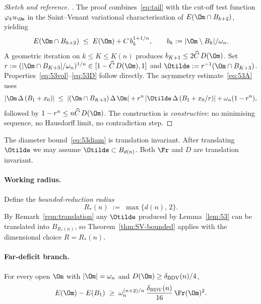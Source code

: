 \begin{proof}[Sketch and reference]
\cite[Lemma~5.3]{BDV}. The proof combines~\eqref{eq:tail} with the
cut-off test function $\varphi_k u_\Om$ in the Saint--Venant
variational characterisation of $E(\Om\cap B_{k+2})$, yielding
\cite[(5.11)]{BDV}
\[
E(\Om\cap B_{k+2}) \;\le\; E(\Om) + C\,b_k^{1+1/n},
\qquad b_k := |\Om\setminus B_k|/\omega_n.
\]
A geometric iteration on $k\le K\le K(n)$ produces $b_{K+1}\le
2\widehat C\,D(\Om)$. Set $r:=(|\Om\cap B_{K+3}|/\omega_n)^{1/n}\in
[1-\widehat C\,D(\Om),1]$ and $\Otilde:=r^{-1}(\Om\cap B_{K+3})$.
Properties~\eqref{eq:53vol}--\eqref{eq:53D} follow directly. The
asymmetry estimate~\eqref{eq:53A} uses
\[
|\Om\,\Delta\,(B_1+x_0)|
\;\le\;
|(\Om\cap B_{K+3})\,\Delta\,\Om|
+ r^n\,|\Otilde\,\Delta\,(B_1+x_0/r)|
+ \omega_n(1-r^n),
\]
followed by $1-r^n\le n\widehat C\,D(\Om)$. The construction is
\emph{constructive}: no minimising sequence, no Hausdorff limit, no
contradiction step.
\end{proof}

\begin{remark}\label{rem:translation}
The diameter bound~\eqref{eq:53diam} is translation invariant. After
translating $\Otilde$ we may assume $\Otilde\subset B_{d(n)}$. Both
$\Fr$ and $D$ are translation invariant.
\end{remark}

\paragraph{Working radius.} Define the \emph{bounded-reduction radius}
\begin{equation}\label{eq:Rstar}
R_*(n) \;:=\; \max\bigl\{d(n),\,2\bigr\}.
\end{equation}
By Remark~\ref{rem:translation} any $\Otilde$ produced by
Lemma~\ref{lem:53} can be translated into $B_{R_*(n)}$, so
Theorem~\ref{thm:SV-bounded} applies with the dimensional choice
$R=R_*(n)$.

\paragraph{Far-deficit branch.}

\begin{lemma}\label{lem:far}
For every open $\Om$ with $|\Om|=\omega_n$ and
$D(\Om)\ge\delta_{\rm BDV}(n)/4$,
\begin{equation}\label{eq:far-quad}
E(\Om)-E(B_1) \;\ge\;
\omega_n^{(n+2)/n}\,\frac{\delta_{\rm BDV}(n)}{16}\,\Fr(\Om)^2.
\end{equation}
\end{lemma}

